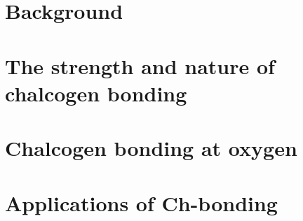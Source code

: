 \documentclass[a4paper, 12pt, oneside]{Thesis}  %
\begin{document}
\mainmatter	  %
\pagestyle{fancy}  %


\part{Background}





\part{The strength and nature of chalcogen bonding}





\part{Chalcogen bonding at oxygen}





\part{Applications of Ch-bonding}











\appendix %




\backmatter


\end{document}
